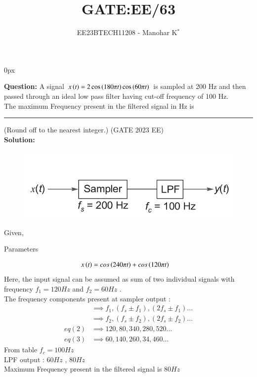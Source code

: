 \documentclass[journal,12pt,twocolumn]{IEEEtran}
\begin{document}
\parindent 0px


\vspace{3cm}

\title{GATE:EE/63}
\author{EE23BTECH11208 - Manohar K$^{*}$
}
\maketitle
\newpage
\bigskip




\textbf{Question:} \hspace{2pt} A signal $x\left(t\right)=2\cos{(180\pi t)}\cos{(60\pi t)}$ is sampled at 200 Hz and then passed through an ideal low pass filter having cut-off frequency of 100 Hz.\\
The maximum Frequency present in the filtered  signal in Hz is \rule{1cm}{0.5mm} (Round off to the nearest integer.) \hfill (GATE 2023 EE)\\
\noindent \textbf{Solution:}\\
\begin{figure}[ht]
	\centering
	\includegraphics[width=1\linewidth]{figs/answerdia.png}
\end{figure}
Given, \\
\begin{table}[h]
	\centering
	
	\caption{Parameters}
	\label{tab:GATE.EE.2023.63}
\end{table}
\begin{align}
	x\left(t\right)&=cos\left(240\pi t\right) + cos\left(120\pi t\right)
\end{align}
Here, the input signal can be assumed as sum of two individual signals with frequency $f_1 =120Hz$ and $f_2 =60Hz$ .\\
The frequency components present at sampler output :\\
\begin{align}
	&\implies f_1 , (f_s\pm f_1) , (2f_s \pm f_1) \dots\\
	&\implies f_2 , (f_s\pm f_2) , (2f_s\pm f_2) \dots\\
	eq (2) &\implies 120, 80,340,280,520 \dots\\
	eq (3) &\implies 60 , 140,260,34,460 \dots 
	 \end{align}
From table $f_c = 100Hz$ \\
LPF output : $60Hz$ , $80Hz$\\
Maximum Frequency present in the filtered signal is $80Hz$
\end{document}
